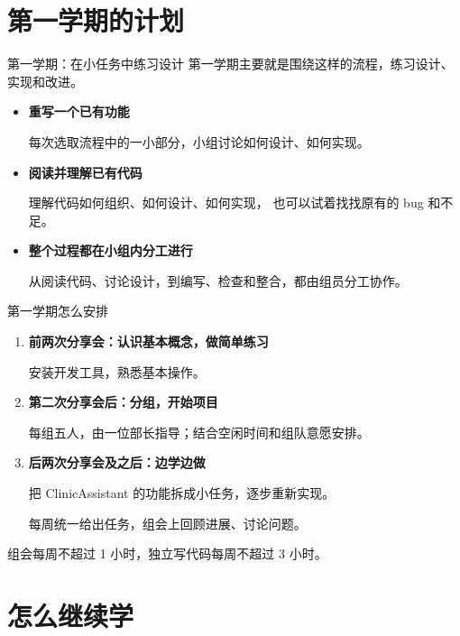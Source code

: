 \documentclass[aspectratio=169]{beamer}
\begin{document}
\section{第一学期的计划}

\begin{frame}{第一学期：在小任务中练习设计}
  第一学期主要就是围绕这样的流程，练习设计、实现和改进。
  \par\bigskip
  \begin{itemize}
    \item \textbf{重写一个已有功能}\par
      每次选取流程中的一小部分，小组讨论如何设计、如何实现。
    \item \textbf{阅读并理解已有代码}\par
      理解代码如何组织、如何设计、如何实现，
      也可以试着找找原有的 bug 和不足。
    \item \textbf{整个过程都在小组内分工进行}\par
      从阅读代码、讨论设计，到编写、检查和整合，都由组员分工协作。
  \end{itemize}
\end{frame}

\begin{frame}{第一学期怎么安排}
  \begin{enumerate}
    \item \textbf{前两次分享会：认识基本概念，做简单练习}\par
      安装开发工具，熟悉基本操作。
    \item \textbf{第二次分享会后：分组，开始项目}\par
      每组五人，由一位部长指导；结合空闲时间和组队意愿安排。
    \item \textbf{后两次分享会及之后：边学边做}\par
      把 ClinicAssistant 的功能拆成小任务，逐步重新实现。\par
      每周统一给出任务，组会上回顾进展、讨论问题。
  \end{enumerate}
  \bigskip
  \alert{组会每周不超过 1 小时，独立写代码每周不超过 3 小时。}
\end{frame}

\section{怎么继续学}
\end{document}

